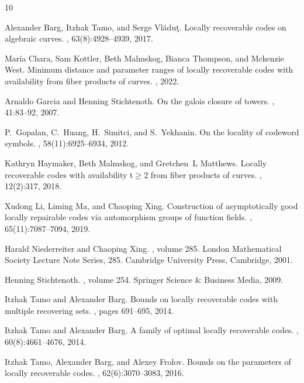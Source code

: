 \documentclass{amsart}
\theoremstyle{definition}
\begin{document}
\newpage
%

\begin{thebibliography}{10}

Alexander Barg, Itzhak Tamo, and Serge Vl{\u{a}}du{\c{t}}.
\newblock Locally recoverable codes on algebraic curves.
, 63(8):4928--4939,
  2017.

María Chara, Sam Kottler, Beth Malmskog, Bianca Thompson, and Mckenzie West.
\newblock Minimum distance and parameter ranges of locally recoverable codes
  with availability from fiber products of curves.
\newblock {\em [arXiv:2204.03755]}, 2022.

Arnaldo Garcia and Henning Stichtenoth.
\newblock On the galois closure of towers.
, 41:83--92,
  2007.

P.~Gopalan, C.~Huang, H.~Simitci, and S.~Yekhanin.
\newblock On the locality of codeword symbols.
, 58(11):6925–6934, 2012.

Kathryn Haymaker, Beth Malmskog, and Gretchen~L Matthews.
\newblock Locally recoverable codes with availability t$\geq$2 from fiber
  products of curves.
, 12(2):317, 2018.

Xudong Li, Liming Ma, and Chaoping Xing.
\newblock Construction of asymptotically good locally repairable codes via
  automorphism groups of function fields.
, 65(11):7087--7094, 2019.

Harald Niederreiter and Chaoping Xing.
, volume 285.
\newblock London Mathematical Society Lecture Note Series, 285. Cambridge
  University Press, Cambridge, 2001.

Henning Stichtenoth.
, volume 254.
\newblock Springer Science \& Business Media, 2009.

Itzhak Tamo and Alexander Barg.
\newblock Bounds on locally recoverable codes with multiple recovering sets.
, pages
  691--695, 2014.

Itzhak Tamo and Alexander Barg.
\newblock A family of optimal locally recoverable codes.
, 60(8):4661--4676,
  2014.

Itzhak Tamo, Alexander Barg, and Alexey Frolov.
\newblock Bounds on the parameters of locally recoverable codes.
, 62(6):3070--3083,
  2016.

\end{thebibliography}
\end{document}
